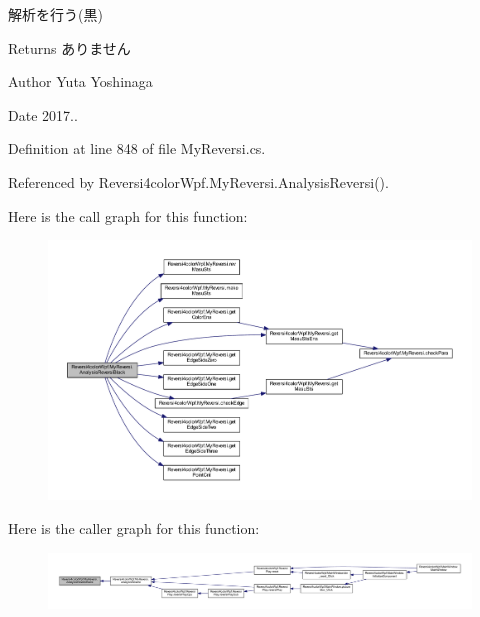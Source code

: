 解析を行う(黒) 

\begin{DoxyReturn}{Returns}
ありません 
\end{DoxyReturn}
\begin{DoxyAuthor}{Author}
Yuta Yoshinaga 
\end{DoxyAuthor}
\begin{DoxyDate}{Date}
2017.. 
\end{DoxyDate}


Definition at line 848 of file My\+Reversi.\+cs.



Referenced by Reversi4color\+Wpf.\+My\+Reversi.\+Analysis\+Reversi().



Here is the call graph for this function\+:
\nopagebreak
\begin{figure}[H]
\begin{center}
\leavevmode
\includegraphics[width=350pt]{class_reversi4color_wpf_1_1_my_reversi_af3e53dce82787cfdad079a37c2c73f61_cgraph}
\end{center}
\end{figure}




Here is the caller graph for this function\+:
\nopagebreak
\begin{figure}[H]
\begin{center}
\leavevmode
\includegraphics[width=350pt]{class_reversi4color_wpf_1_1_my_reversi_af3e53dce82787cfdad079a37c2c73f61_icgraph}
\end{center}
\end{figure}


